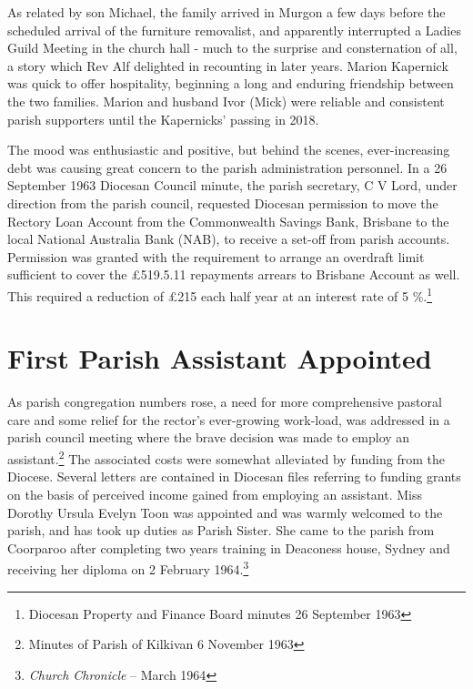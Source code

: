 As related by son Michael, the family arrived in Murgon a few days before the scheduled arrival of the furniture removalist, and apparently interrupted a Ladies Guild Meeting in the church hall - much to the surprise and consternation of all, a story which Rev Alf delighted in recounting in later years. Marion Kapernick was quick to offer hospitality, beginning a long and enduring friendship between the two families. Marion and husband Ivor (Mick) were reliable and consistent parish supporters until the Kapernicks' passing in 2018.



The mood was enthusiastic and positive, but behind the scenes, ever-increasing debt was causing great concern to the parish administration personnel. In a 26 September 1963 Diocesan Council minute, the parish secretary, C V Lord, under direction from the parish council, requested Diocesan permission to move the Rectory Loan Account from the Commonwealth Savings Bank, Brisbane to the local National Australia Bank (NAB), to receive a set-off from parish accounts. Permission was granted with the requirement to arrange an overdraft limit sufficient to cover the \pounds519.5.11 repayments arrears to Brisbane Account as well. This required a reduction of \pounds215 each half year at an interest rate of 5  \%.\footnote{Diocesan Property and Finance Board minutes 26 September 1963}


\section{First Parish Assistant Appointed}



As parish congregation numbers rose, a need for more comprehensive pastoral care and some relief for the rector's ever-growing work-load, was addressed in a parish council meeting where the brave decision was made to employ an assistant.\footnote{Minutes of Parish of Kilkivan 6 November 1963} The associated costs were somewhat alleviated by funding from the Diocese. Several letters are contained in Diocesan files referring to funding grants on the basis of perceived income gained from employing an assistant. Miss Dorothy Ursula Evelyn Toon was appointed and was warmly welcomed to the parish, and has took up duties as Parish Sister. She came to the parish from Coorparoo after completing two years training in Deaconess house, Sydney and receiving her diploma on 2 February 1964.\footnote{\emph{Church Chronicle} -- March 1964}


